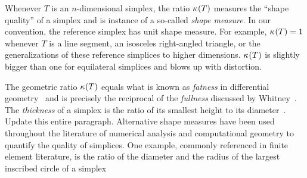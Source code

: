 \documentclass[10pt,a4paper]{article}
\newcommand{\mwl}[1]{{\color{red}#1}}
\begin{document}
\begin{remark}
    Whenever $T$ is an $n$-dimensional simplex, the ratio $\kappa_{}(T)$ measures the ``shape quality'' of a simplex and is instance of a so-called \emph{shape measure}.
    In our convention, the reference simplex has unit shape measure.
    For example, $\kappa_{}(T)=1$ whenever $T$ is a line segment, an isosceles right-angled triangle, or the generalizations of these reference simplices to higher dimensions. $\kappa_{}(T)$ is slightly bigger than one for equilateral simplices and blows up with distortion.

    The geometric ratio $\kappa_{}(T)$ equals what is known as \emph{fatness} in differential geometry~\cite{cheeger1984curvature} and is precisely the reciprocal of the \emph{fullness} discussed by Whitney~\cite{whitney2012geometric}. 
    The \emph{thickness} of a simplex is the ratio of its smallest height to its diameter~\cite{munkres2016elementary}. \mwl{Update this entire paragraph.}
    Alternative shape measures have been used throughout the literature of numerical analysis and computational geometry to quantify the quality of simplices.
    One example, commonly referenced in finite element literature, is the ratio of the diameter and the radius of the largest inscribed circle of a simplex 
\end{remark}
\end{document}
